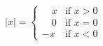 \documentclass[12pt]{amsart}
\begin{document}
\sicpsize
\[
  |x| = 
    \begin{cases}
       \quad x & \text{if } x > 0 \\
       \quad 0 & \text{if } x = 0 \\
       -x & \text{if } x < 0
    \end{cases}
\]
\end{document}
